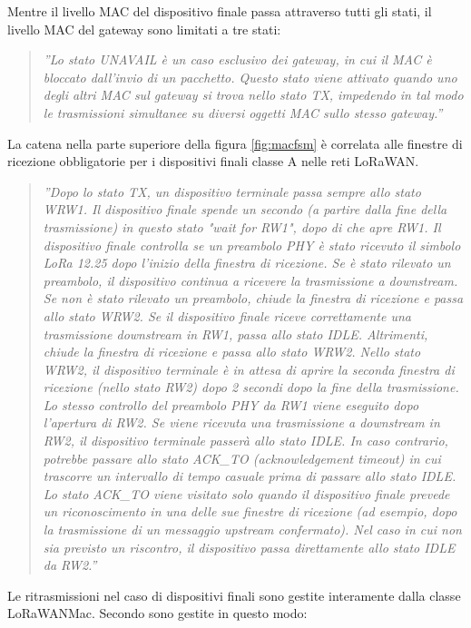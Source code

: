 \documentclass[a4paper]{report} %
\begin{document}
Mentre il livello MAC del dispositivo finale passa attraverso tutti gli stati, il livello MAC del gateway sono limitati a tre stati:
\begin{quote}
	\textit{''Lo stato UNAVAIL è un caso esclusivo dei gateway, in cui il MAC è bloccato dall'invio di un pacchetto. Questo stato viene attivato quando uno degli altri MAC sul gateway si trova nello stato TX, impedendo in tal modo le trasmissioni simultanee su diversi oggetti MAC sullo stesso gateway.''} 
\end{quote}	
La catena nella parte superiore della figura \ref{fig:macfsm} è correlata alle finestre di ricezione obbligatorie per i dispositivi finali classe A nelle reti LoRaWAN. 
\begin{quote}
	\textit{''Dopo lo stato TX, un dispositivo terminale passa sempre allo stato WRW1. Il dispositivo finale spende un secondo (a partire dalla fine della trasmissione) in questo stato "wait for RW1", dopo di che apre RW1. Il dispositivo finale controlla se un preambolo PHY è stato ricevuto il simbolo LoRa 12.25 dopo l'inizio della finestra di ricezione. Se è stato rilevato un preambolo, il dispositivo continua a ricevere la trasmissione a downstream.	Se non è stato rilevato un preambolo, chiude la finestra di ricezione e passa allo stato WRW2. Se il dispositivo finale riceve correttamente una trasmissione downstream in RW1, passa allo stato IDLE. Altrimenti, chiude la finestra di ricezione e passa allo stato WRW2. Nello stato WRW2, il dispositivo terminale è in attesa di aprire la seconda finestra di ricezione (nello stato RW2) dopo 2 secondi dopo la fine della trasmissione. Lo stesso controllo del preambolo PHY da RW1 viene eseguito dopo l'apertura di RW2. Se viene ricevuta una trasmissione a downstream in RW2, il dispositivo terminale passerà allo stato IDLE. In caso contrario, potrebbe passare allo stato ACK\_TO (acknowledgement timeout) in cui trascorre un intervallo di tempo casuale prima di passare allo stato IDLE. Lo stato ACK\_TO viene visitato solo quando il dispositivo finale prevede un riconoscimento in una delle sue finestre di ricezione (ad esempio, dopo la trasmissione di un messaggio upstream confermato). Nel caso in cui non sia previsto un riscontro, il dispositivo passa direttamente allo stato IDLE da RW2.''}
\end{quote}	
Le ritrasmissioni nel caso di dispositivi finali sono gestite interamente dalla classe LoRaWANMac. Secondo \cite{art:rif.49} sono gestite in questo modo:
\end{document}

